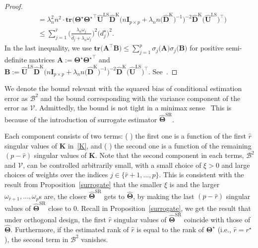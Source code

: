 \documentclass[12pt]{article}
\newcommand{\RN}[1]{%
  \textup{\uppercase\expandafter{\romannumeral#1}}%
}
\begin{document}
\begin{proof}
\begin{align}
    &= \lambda_{n}^{2} n^{2} \cdot \textbf{tr}\big(\boldsymbol{\Theta^\star} \boldsymbol{\Theta^\star}^{\top} \widehat{\mathbf{U}}^{\text{LS}}\widehat{\mathbf{D}}^{\text{K}}\big(n\mathbf{I}_{p \times p}+\lambda_{n}n\big(\widehat{\mathbf{D}}^{\text{K}}\big)^{-1}\big)^{-2} \widehat{\mathbf{D}}^{\text{K}} \big(\widehat{\mathbf{U}}^{\text{LS}}\big)^{\top}\big) \nonumber \\
    &\leq \sum_{j=1}^{\widehat{r}}\bigg( \frac{\lambda_{n}\omega_{j}}{\widehat{d}_{j}+\lambda_{n}\omega_{j}} \bigg)^{2} \big(d_{j}^{\star}\big)^{2}.
    \label{tr2}
\end{align}
In the last inequality, we use $\textbf{tr}\big(\mathbf{A}^{\top}\mathbf{B}\big)\leq \sum_{j=1}^{p}\sigma_{j}\big(\mathbf{A}\big)\sigma_{j}\big(\mathbf{B}\big)$ for positive semi-definite matrices $\mathbf{A}:=\boldsymbol{\Theta^\star} \boldsymbol{\Theta^\star}^{\top}$ and $\mathbf{B}:=\widehat{\mathbf{U}}^{\text{LS}}\widehat{\mathbf{D}}^{\text{K}}\big(n\mathbf{I}_{p \times p}+\lambda_{n}n\big(\widehat{\mathbf{D}}^{\text{K}}\big)^{-1}\big)^{-2} \widehat{\mathbf{D}}^{\text{K}} \big(\widehat{\mathbf{U}}^{\text{LS}}\big)^{\top}$.
See~\citet{ruhe1970perturbation}.
\end{proof}

We denote the bound relevant with the squared bias of conditional estimation error as $\mathcal{B}^{2}$ and the bound corresponding with the variance component of the error as $\mathcal{V}$.
Admittedly, the bound is not tight in a minimax sense~\citep{negahban2011estimation,koltchinskii2011nuclear}
This is because of the introduction of surrogate estimator $\widehat{\mathbf{\Theta}}^{\text{SR}}$.

Each component consists of two terms: (\RN{1}) the first one is a function of the first $\widehat{r}$ singular values of $\mathbf{K}$ in~\eqref{K},
and (\RN{2}) the second one is a function of the remaining $(p-\widehat{r})$ singular values of $\mathbf{K}$. 
Note that the second component in each terms, $\mathcal{B}^{2}$ and $\mathcal{V}$, can be controlled arbitrarily small, with a small choice of $\xi>0$ and large choices of weights over the indices $j\in\{\widehat{r}+1,\dots,p\}$.
This is consistent with the result from Proposition~\ref{surrogate} that the smaller $\xi$ is and the larger $\omega_{\widehat{r}+1},\dots,\omega_{p}$s are, the closer $\widehat{\mathbf{\Theta}}^{\text{SR}}$ gets to $\widehat{\mathbf{\Theta}}$, by making the last $(p-\widehat{r})$ singular values of $\widehat{\mathbf{\Theta}}^{\text{SR}}$ close to $0$.
Recall in Proposition~\ref{surrogate}, we get the result that under orthogonal design, the first $\widehat{r}$ singular values of $\widehat{\mathbf{\Theta}}^{\text{SR}}$ coincide with those of $\widehat{\mathbf{\Theta}}$. 
Furthermore, if the estimated rank of $\widehat{r}$ is equal to the rank of $\boldsymbol{\Theta}^{\star}$ (i.e., $\widehat{r}=r^{\star}$), the second term in $\mathcal{B}^{2}$ vanishes.
\end{document}
